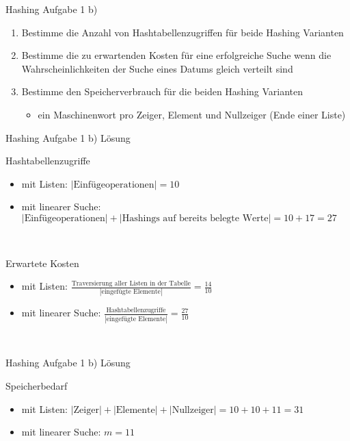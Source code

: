 	\begin{frame}{Hashing Aufgabe 1 b)}
		\begin{enumerate}
			\item Bestimme die Anzahl von Hashtabellenzugriffen für beide Hashing Varianten
			\item Bestimme die zu erwartenden Kosten für eine erfolgreiche Suche wenn die Wahrscheinlichkeiten der Suche eines Datums gleich verteilt sind
			\item Bestimme den Speicherverbrauch für die beiden Hashing Varianten
			\begin{itemize}
				\item ein Maschinenwort pro Zeiger, Element und Nullzeiger (Ende einer Liste) 
			\end{itemize}  
		\end{enumerate}
	\end{frame}

	\begin{frame} {Hashing Aufgabe 1 b) Lösung}
		\begin{block}{Hashtabellenzugriffe}
			\begin{itemize}
				\item mit Listen: $|\text{Einfügeoperationen}| = 10$
				\item mit linearer Suche: $|\text{Einfügeoperationen}| + |\text{Hashings auf bereits belegte Werte}| = 10 + 17 = 27 $
			\end{itemize}
		\end{block}
		\ \\
		\begin{block}{Erwartete Kosten}
			\begin{itemize}
				\item mit Listen: $ \frac{\text{Traversierung aller Listen in der Tabelle}}{|\text{eingefügte Elemente}|}= \frac{14}{10}  $
				\item mit linearer Suche: $ \frac{\text{Hashtabellenzugriffe}}{|\text{eingefügte Elemente}|} =  \frac{27}{10} $
			\end{itemize}
		\end{block}

		\ \\	


	\end{frame}

	\begin{frame}{Hashing Aufgabe 1 b) Lösung}
		\begin{block}{Speicherbedarf}
			\begin{itemize}
				\item mit Listen: $|\text{Zeiger}| + |\text{Elemente}| + |\text{Nullzeiger}| = 10 + 10 + 11 = 31$
				\item mit linearer Suche: $m = 11$
			\end{itemize}
		\end{block}

	\end{frame}

